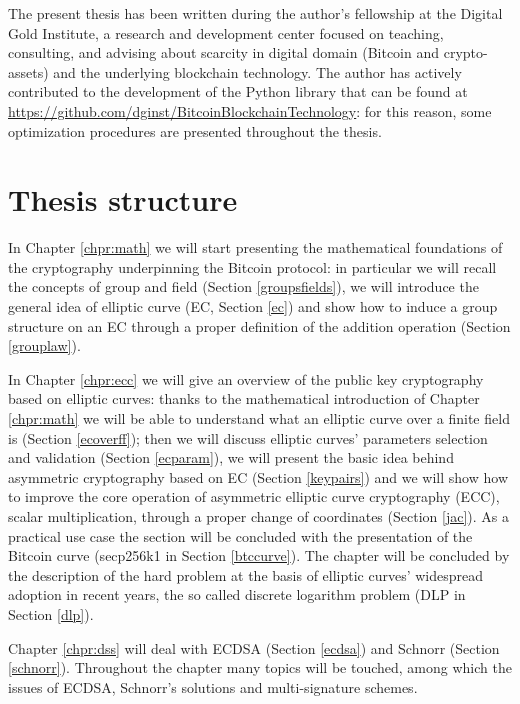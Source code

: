 \bigskip
\noindent
The present thesis has been written during the author's fellowship at the Digital Gold Institute, a research and development center focused on teaching, consulting, and advising about scarcity in digital domain (Bitcoin and crypto-assets) and the underlying blockchain technology. The author has actively contributed to the development of the Python library that can be found at \url{https://github.com/dginst/BitcoinBlockchainTechnology}: for this reason, some optimization procedures are presented throughout the thesis.

\bigskip

\bigskip

\section{Thesis structure}
In Chapter \ref{chpr:math} we will start presenting the mathematical foundations of the cryptography underpinning the Bitcoin protocol: in particular we will recall the concepts of group and field (Section \ref{groupsfields}), we will introduce the general idea of elliptic curve (EC, Section \ref{ec}) and show how to induce a group structure on an EC through a proper definition of the addition operation (Section \ref{grouplaw}).

\bigskip
\noindent
In Chapter \ref{chpr:ecc} we will give an overview of the public key cryptography based on elliptic curves: thanks to the mathematical introduction of Chapter \ref{chpr:math} we will be able to understand what an elliptic curve over a finite field is (Section \ref{ecoverff}); then we will discuss elliptic curves' parameters selection and validation (Section \ref{ecparam}), we will present the basic idea behind asymmetric cryptography based on EC (Section \ref{keypairs}) and we will show how to improve the core operation of asymmetric elliptic curve cryptography (ECC), scalar multiplication, through a proper change of coordinates (Section \ref{jac}). As a practical use case the section will be concluded with the presentation of the Bitcoin curve (secp256k1 in Section \ref{btccurve}). The chapter will be concluded by the description of the hard problem at the basis of elliptic curves' widespread adoption in recent years, the so called discrete logarithm problem (DLP in Section \ref{dlp}).

\bigskip
\noindent
Chapter \ref{chpr:dss} will deal with ECDSA (Section \ref{ecdsa}) and Schnorr (Section \ref{schnorr}). Throughout the chapter many topics will be touched, among which the issues of ECDSA, Schnorr's solutions and multi-signature schemes.


